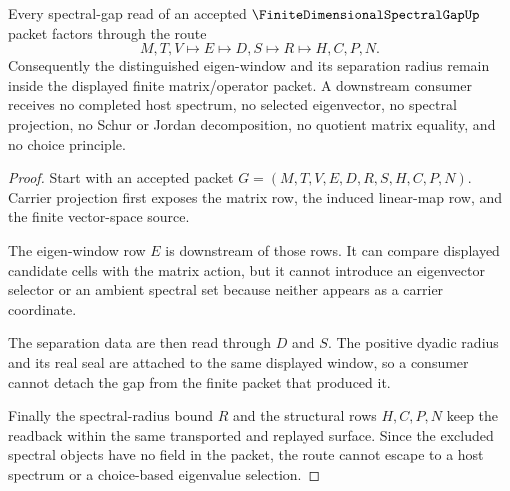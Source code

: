 \begin{theorem}
\label{thm:finite-dimensional-spectral-gap-nonescape}
Every spectral-gap read of an accepted $\FiniteDimensionalSpectralGapUp$ packet factors through the route
$$
M,T,V \longmapsto E \longmapsto D,S \longmapsto R \longmapsto H,C,P,N .
$$
Consequently the distinguished eigen-window and its separation radius remain inside the displayed finite matrix/operator packet. A downstream consumer receives no completed host spectrum, no selected eigenvector, no spectral projection, no Schur or Jordan decomposition, no quotient matrix equality, and no choice principle.
\end{theorem}
\begin{proof}
Start with an accepted packet $G=(M,T,V,E,D,R,S,H,C,P,N)$. Carrier projection first exposes the matrix row, the induced linear-map row, and the finite vector-space source.

The eigen-window row $E$ is downstream of those rows. It can compare displayed candidate cells with the matrix action, but it cannot introduce an eigenvector selector or an ambient spectral set because neither appears as a carrier coordinate.

The separation data are then read through $D$ and $S$. The positive dyadic radius and its real seal are attached to the same displayed window, so a consumer cannot detach the gap from the finite packet that produced it.

Finally the spectral-radius bound $R$ and the structural rows $H,C,P,N$ keep the readback within the same transported and replayed surface. Since the excluded spectral objects have no field in the packet, the route cannot escape to a host spectrum or a choice-based eigenvalue selection.
\end{proof}



